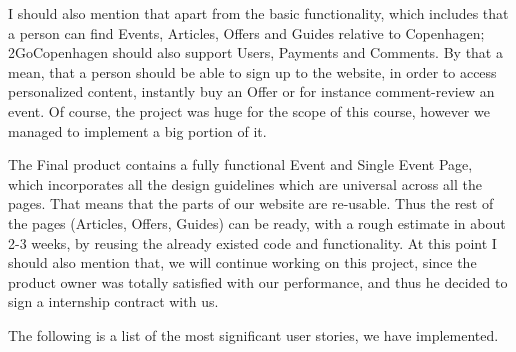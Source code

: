 I should also mention that apart from the basic functionality, which includes that a person can find Events, Articles, Offers and Guides relative to Copenhagen; 2GoCopenhagen should also support Users, Payments and Comments. By that a mean, that a person should be able to sign up to the website, in order to access personalized content, instantly buy an Offer or  for instance comment-review an event. Of course, the project was huge for the scope of this course, however we managed to implement a big portion of it.

The Final product contains a fully functional Event and Single Event Page, which incorporates all the design guidelines which are universal across all the pages. That means that the parts of our website are re-usable. Thus the rest of the pages (Articles, Offers, Guides) can be ready, with a rough estimate in about 2-3 weeks, by reusing the already existed code and functionality. At this point I should also mention that, we will continue working on this project, since the product owner was totally satisfied with our performance, and thus he decided to sign a internship contract with us.

The following is a list of the most significant user stories, we have implemented.

